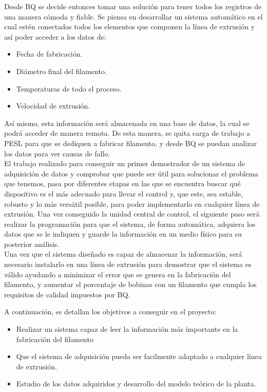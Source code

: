 Desde BQ se decide entonces tomar una solución para tener todos los registros de una manera cómoda y fiable. Se piensa en desarrollar un sistema automático en el cual estén conectados todos los elementos que componen la línea de extrusión y así poder acceder a los datos de:

\begin{itemize}
    \item{Fecha de fabricación.}
    \item{Diámetro final del filamento.}
    \item{Temperaturas de todo el proceso.}
    \item{Velocidad de extrusión.}
\end{itemize}

Así mismo, esta información será almacenada en una base de datos, la cual se podrá acceder de manera remota. De esta manera, se quita carga de trabajo a PESL para que se dediquen a fabricar filamento, y desde BQ se puedan analizar los datos para ver causas de fallo.\\

El trabajo realizado para conseguir un primer demostrador de un sistema de adquisición de datos y comprobar que puede ser útil para solucionar el problema que tenemos, pasa por diferentes etapas en las que se encuentra buscar qué dispositivo es el más adecuado para llevar el control y, que este, sea estable, robusto y lo más versátil posible, para poder implementarlo en cualquier línea de extrusión. Una vez conseguido la unidad central de control, el siguiente paso será realizar la programación para que el sistema, de forma automática, adquiera los datos que se le indiquen y guarde la información en un medio físico para su posterior análisis.\\

Una vez que el sistema diseñado es capaz de almacenar la información, será necesario instalarlo en una línea de extrusión para demostrar que el sistema es válido ayudando a minimizar el error que se genera en la fabricación del filamento, y aumentar el porcentaje de bobinas con un filamento que cumpla los requisitos de calidad impuestos por BQ.

A continuación, se detallan los objetivos a conseguir en el proyecto:

\begin{itemize}
    \item Realizar un sistema capaz de leer la información más importante en la fabricación del filamento
    \item Que el sistema de adquisición pueda ser facilmente adaptado a cualquier línea de extrusión.
    \item Estudio de los datos adquiridos y desarrollo del modelo teórico de la planta.
\end{itemize}
\label{Listado_objetivos}

